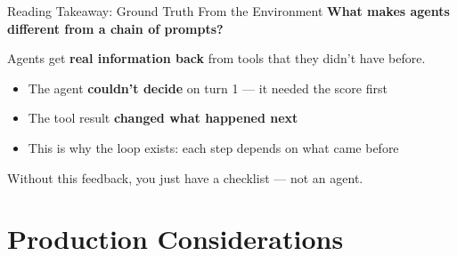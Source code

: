 \documentclass[aspectratio=169]{beamer}
\begin{document}
\begin{frame}{Reading Takeaway: Ground Truth From the Environment}
\textbf{What makes agents different from a chain of prompts?}
\vspace{0.3cm}

Agents get \textbf{real information back} from tools that they didn't have before.
\vspace{0.3cm}

\begin{center}
\end{center}
\vspace{0.3cm}

\begin{itemize}
    \item The agent \textbf{couldn't decide} on turn 1 --- it needed the score first
    \item The tool result \textbf{changed what happened next}
    \item This is why the loop exists: each step depends on what came before
\end{itemize}
\vspace{0.2cm}

Without this feedback, you just have a checklist --- not an agent.
\end{frame}

\section{Production Considerations}
\end{document}
